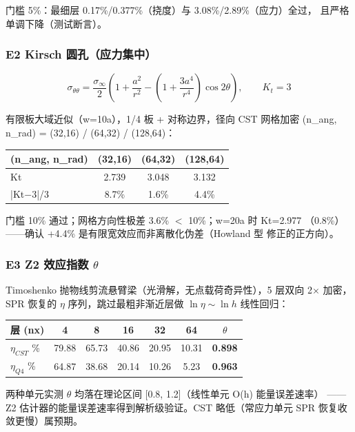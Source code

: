 \documentclass[12pt,a4paper]{ctexart}
\begin{document}
门槛 5\%：最细层 0.17\%/0.377\%（挠度）与 3.08\%/2.89\%（应力）全过，
且严格单调下降（测试断言）。

\subsubsection{E2 Kirsch 圆孔（应力集中）}

$$\sigma_{\theta\theta} = \frac{\sigma_\infty}{2}\left(1 + \frac{a^2}{r^2} - \left(1 + \frac{3a^4}{r^4}\right)\cos 2\theta\right), \qquad K_t = 3$$

有限板大域近似（w=10a），1/4 板 + 对称边界，径向 CST 网格加密
(n\_ang, n\_rad) = (32,16) / (64,32) / (128,64)：

\begin{table}[h]
\centering
\small
\begin{tabular}{lccc}
\toprule
(n\_ang, n\_rad) & (32,16) & (64,32) & (128,64) \\
\midrule
Kt & 2.739 & 3.048 & 3.132 \\
|Kt$-$3|/3 & 8.7\% & 1.6\% & 4.4\% \\
\bottomrule
\end{tabular}
\end{table}

门槛 10\% 通过；网格方向性极差 3.6\% $<$ 10\%；w=20a 时 Kt=2.977
（0.8\%）——确认 +4.4\% 是有限宽效应而非离散化伪差（Howland 型
修正的正方向）。

\subsubsection{E3 Z2 效应指数 \texorpdfstring{$\theta$}{theta}}

Timoshenko 抛物线剪流悬臂梁（光滑解，无点载荷奇异性），5 层双向
2$\times$ 加密，SPR 恢复的 $\eta$ 序列，跳过最粗非渐近层做
$\ln\eta \sim \ln h$ 线性回归：

\begin{table}[h]
\centering
\small
\begin{tabular}{lcccccc}
\toprule
层 (nx) & 4 & 8 & 16 & 32 & 64 & \textbf{$\theta$} \\
\midrule
$\eta_{CST}$ \% & 79.88 & 65.73 & 40.86 & 20.95 & 10.31 & \textbf{0.898} \\
$\eta_{Q4}$ \% & 64.87 & 38.68 & 20.14 & 10.26 & 5.23 & \textbf{0.963} \\
\bottomrule
\end{tabular}
\end{table}

两种单元实测 $\theta$ 均落在理论区间 [0.8, 1.2]（线性单元 O(h) 能量误差速率）
——Z2 估计器的能量误差速率得到解析级验证。CST 略低（常应力单元
SPR 恢复收敛更慢）属预期。
\end{document}
